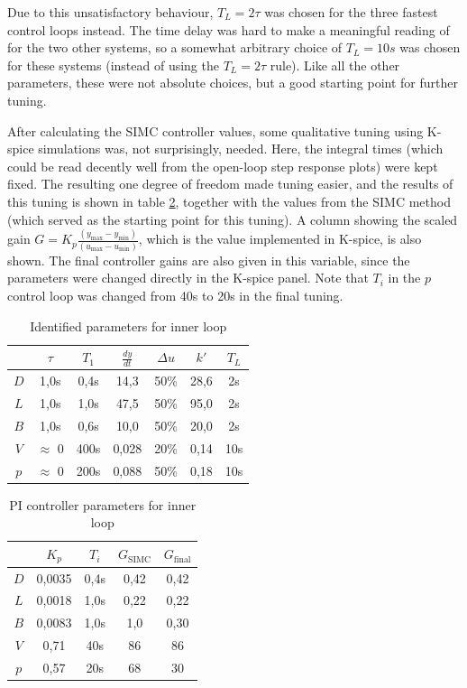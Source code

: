 \documentclass[12pt]{article}
\begin{document}
Due to this unsatisfactory behaviour, $T_L = 2\tau$ was chosen for the three fastest control loops instead. The time delay was hard to make a meaningful reading of for the two other systems, so a somewhat arbitrary choice of $T_L = 10s$ was chosen for these systems (instead of using the $T_L = 2\tau$ rule). Like all the other parameters, these were not absolute choices, but a good starting point for further tuning.

After calculating the SIMC controller values, some qualitative tuning using K-spice simulations was, not surprisingly, needed. Here, the integral times (which could be read decently well from the open-loop step response plots) were kept fixed. The resulting one degree of freedom made tuning easier, and the results of this tuning is shown in table \ref{tab:inner_loop_PI_parameters}, together with the values from the SIMC method (which served as the starting point for this tuning). A column showing the scaled gain $G = K_p \frac{(y_{\max} - y_{\min})}{(u_{\max} - u_{\min})}$, which is the value implemented in K-spice, is also shown. The final controller gains are also given in this variable, since the parameters were changed directly in the K-spice panel. Note that $T_i$ in the $p$ control loop was changed from 40s to 20s in the final tuning.


\begin{table}
\centering
\begin{tabular}{c | c | c | c | c | c || c}
& $\tau$ & $T_1$ & $\frac{dy}{dt}$ & $\Delta u$ & $k'$ & $T_L$ \\ \hline
$D$ & 1,0s & 0,4s & 14,3 & 50\% & 28,6 & 2s \\
$L$ & 1,0s & 1,0s & 47,5 & 50\% & 95,0 & 2s \\
$B$ & 1,0s & 0,6s & 10,0 & 50\% & 20,0 & 2s \\
$V$ & $\approx$ 0 & 400s & 0,028 & 20\% & 0,14 & 10s \\
$p$ & $\approx$ 0 & 200s & 0,088 & 50\% & 0,18 & 10s
\end{tabular}
\caption{Identified parameters for inner loop}
\label{tab:inner_loop_step_responses}
\end{table}


\begin{table}
\centering
\begin{tabular}{c | c | c | c | c}
& $K_p$ & $T_i$ & $G_{\textrm{SIMC}}$ & $G_{\textrm{final}}$ \\ \hline
$D$ & 0,0035 & 0,4s & 0,42 & 0,42\\
$L$ & 0,0018 & 1,0s & 0,22 & 0,22\\
$B$ & 0,0083 & 1,0s & 1,0 & 0,30 \\
$V$ & 0,71 & 40s & 86 & 86 \\
$p$ & 0,57 & 20s & 68 & 30
\end{tabular}
\caption{PI controller parameters for inner loop}
\label{tab:inner_loop_PI_parameters}
\end{table}
\end{document}
